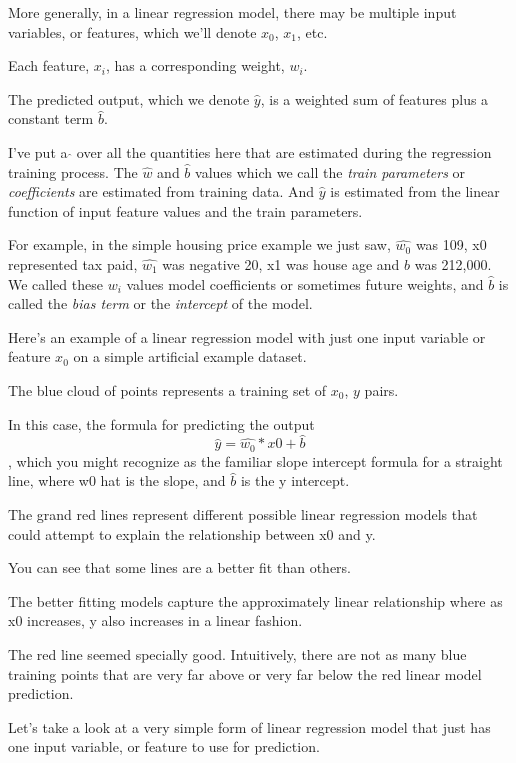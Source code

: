 \begin{multicols}{2}
More generally, in a linear regression model, there may be multiple input variables, or features, which we'll denote $x_0$, $x_1$, etc. 

Each feature, $x_i$, has a corresponding weight, $w_i$. 

The predicted output, which we denote $\hat{y}$, is a weighted sum of features plus a constant term $\hat{b}$. 

I've put a $\hat{}$ over all the quantities here that are estimated during the regression training process. The $\hat{w}$ and $\hat{b}$ values which we call the \emph{train parameters} or \emph{coefficients} are estimated from training data. And $\hat{y}$  is estimated from the linear function of input feature values and the train parameters. 

For example, in the simple housing price example we just saw, $\hat{w_0}$ was 109, x0 represented tax paid, $\hat{w_1}$ was negative 20, x1 was house age and $\hat{b}$ was 212,000. We called these $w_i$ values model coefficients or sometimes future weights, and $\hat{b}$ is called the \emph{bias term} or the \emph{intercept} of the model. 

Here's an example of a linear regression model with just one input variable or feature $x_0$ on a simple artificial example dataset. 

The blue cloud of points represents a training set of $x_0$, $y$ pairs. 

In this case, the formula for predicting the output $$\hat{y} = \hat{w_0}*x0 + \hat{b}$$, which you might recognize as the familiar slope intercept formula for a straight line, where w0 hat is the slope, and $\hat{b}$ is the y intercept. 

The grand red lines represent different possible linear regression models that could attempt to explain the relationship between x0 and y. 

You can see that some lines are a better fit than others. 

The better fitting models capture the approximately linear relationship where as x0 increases, y also increases in a linear fashion. 

The red line seemed specially good. Intuitively, there are not as many blue training points that are very far above or very far below the red linear model prediction. 

Let's take a look at a very simple form of linear regression model that just has one input variable, or feature to use for prediction. 


\end{multicols}
